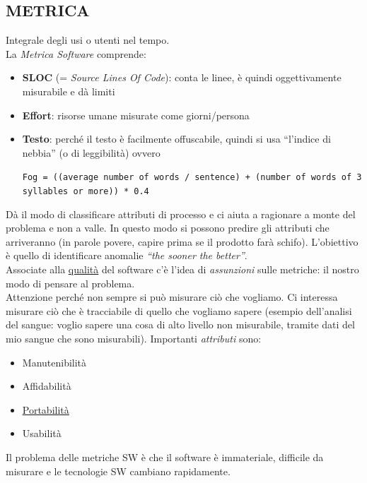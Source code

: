 		\subsection{METRICA}  \label{metrica}
		Integrale degli usi o utenti nel tempo.\\
		La \textit{Metrica Software} comprende:
			\begin{itemize}
				\item \textbf{SLOC} (= \textit{Source Lines Of Code}): conta le linee, è quindi oggettivamente misurabile e dà limiti
				\item \textbf{Effort}: risorse umane misurate come giorni/persona
				\item \textbf{Testo}: perché il testo è facilmente offuscabile, quindi si usa ``l'indice di nebbia'' (o di leggibilità) ovvero
				\begin{center}
					\texttt{Fog = ((average number of words / sentence) + (number of words of 3 syllables or more)) * 0.4}
				\end{center}
			\end{itemize}
		Dà il modo di classificare attributi di processo e ci aiuta a ragionare a monte del problema e non a valle. In questo modo si possono predire gli attributi che arriveranno (in parole povere, capire prima se il prodotto farà schifo). L'obiettivo è quello di identificare anomalie \textit{``the sooner the better''}. \\
		Associate alla \underline{\hyperref[qualita]{qualità}} del software c'è l'idea di \textit{assunzioni} sulle metriche: il nostro modo di pensare al problema. \\
		Attenzione perché non sempre si può misurare ciò che vogliamo. Ci interessa misurare ciò che è tracciabile
		di quello che vogliamo sapere (esempio dell'analisi del sangue: voglio sapere una cosa di alto livello non misurabile, tramite dati del mio sangue che sono misurabili).
		Importanti \textit{attributi} sono:
		\begin{itemize}
			\item Manutenibilità
			\item Affidabilità
			\item  \underline{\hyperref[portabilita]{Portabilità}}
			\item Usabilità
		\end{itemize}
		Il problema delle metriche SW è che il software è immateriale, difficile da misurare e le tecnologie SW cambiano rapidamente.
